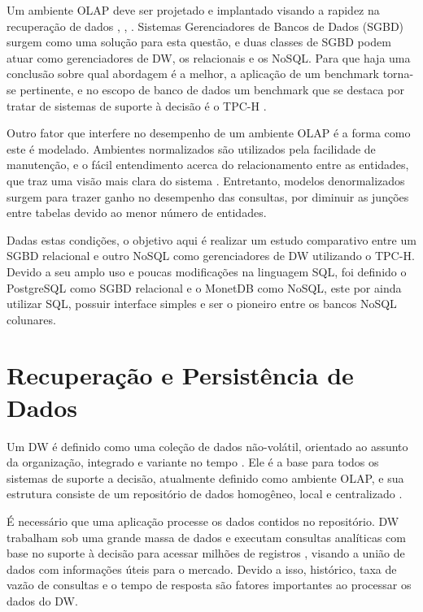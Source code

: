 \documentclass[12pt]{article}
\begin{document}
Um ambiente OLAP deve ser projetado e implantado visando a rapidez na recuperação de dados \cite{wrembel2007data}, 
\cite{codd1998providing}, \cite{kimball2002dw}. Sistemas Gerenciadores de Bancos de Dados (SGBD) surgem como uma solução 
para esta questão, e duas classes de SGBD podem atuar como gerenciadores de DW, os relacionais e os NoSQL. 
Para que haja uma conclusão sobre qual abordagem é a melhor, a aplicação de um benchmark torna-se pertinente, 
e no escopo de banco de dados um benchmark que se destaca por tratar de sistemas de suporte à decisão é o TPC-H \cite{tpch2017page}. 

Outro fator que interfere no desempenho de um ambiente OLAP é a forma como este é modelado. 
Ambientes normalizados são utilizados pela facilidade de manutenção,
e o fácil entendimento acerca do relacionamento entre as entidades, que traz uma visão mais clara do sistema \cite{bax2003modelagem}. 
Entretanto, modelos denormalizados surgem para trazer ganho no desempenho das consultas, por diminuir 
as junções entre tabelas devido ao menor número de entidades.

Dadas estas condições, o objetivo aqui é realizar um estudo comparativo entre um SGBD relacional e outro NoSQL 
como gerenciadores de DW utilizando o TPC-H. Devido a seu amplo uso e poucas modificações na linguagem SQL, foi definido o PostgreSQL 
como SGBD relacional e o MonetDB como NoSQL, este por ainda utilizar SQL, possuir interface simples e ser o pioneiro 
entre os bancos NoSQL colunares.

\section{Recuperação e Persistência de Dados}

Um DW é definido como uma coleção de dados não-volátil, orientado ao assunto da organização, 
integrado e variante no tempo \cite{inmon2005building}. Ele é a base para todos os sistemas de 
suporte a decisão, atualmente definido como ambiente OLAP, e sua estrutura consiste de um 
repositório de dados homogêneo, local e centralizado \cite{wrembel2007data}.

É necessário que uma aplicação processe os dados contidos no repositório. DW trabalham sob uma grande 
massa de dados e executam consultas analíticas com base no suporte à decisão para acessar milhões de registros 
\cite{chaudhuri1997overview}, visando a união de dados com informações úteis para o mercado. Devido a isso, histórico, 
taxa de vazão de consultas e o tempo de resposta são fatores importantes ao processar os dados do DW.
\end{document}

